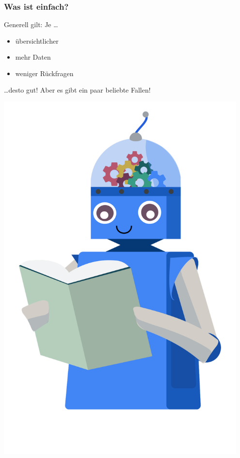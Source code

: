 \documentclass[aspectratio=43,x11names]{beamer}
\begin{document}
\begin{frame}
\frametitle{Was ist einfach?}

\begin{minipage}{0.45\textwidth}
Generell gilt: Je \dots
\bigskip

\begin{itemize}
\item übersichtlicher
\item mehr Daten
\item weniger Rückfragen
\end{itemize}
\bigskip

\dots desto gut! Aber es gibt ein paar beliebte Fallen!

\end{minipage}
\begin{minipage}{0.45\textwidth}
\begin{center}
\includegraphics[width=0.95\textwidth]{images/learning} 
\end{center}
\end{minipage}

\end{frame}
\end{document}
